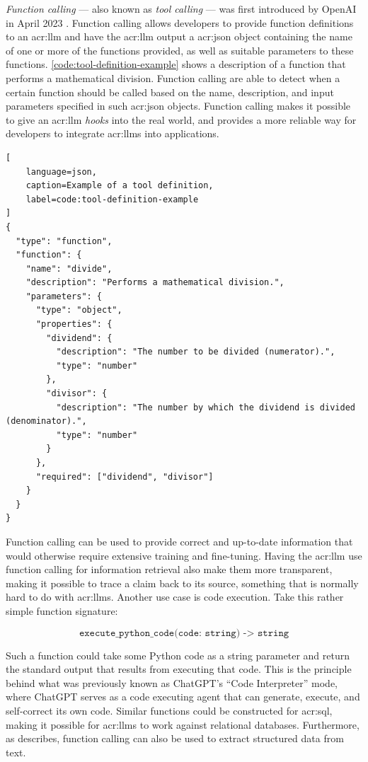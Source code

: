 \textit{Function calling} --- also known as \textit{tool calling} --- was first introduced by OpenAI in April 2023 \citep{eletiFunctionCallingOther2023}. Function calling allows developers to provide function definitions to an \gls{acr:llm} and have the \gls{acr:llm} output a \acrshort{acr:json} object containing the name of one or more of the functions provided, as well as suitable parameters to these functions. \autoref{code:tool-definition-example} shows a description of a function that performs a mathematical division. Function calling  are able to detect when a certain function should be called based on the name, description, and input parameters specified in such \acrshort{acr:json} objects. Function calling makes it possible to give an \gls{acr:llm} \textit{hooks} into the real world, and provides a more reliable way for developers to integrate \glspl{acr:llm} into applications.

\begin{lstlisting}[
    language=json,
    caption=Example of a tool definition,
    label=code:tool-definition-example
]
{
  "type": "function",
  "function": {
    "name": "divide",
    "description": "Performs a mathematical division.",
    "parameters": {
      "type": "object",
      "properties": {
        "dividend": {
          "description": "The number to be divided (numerator).",
          "type": "number"
        },
        "divisor": {
          "description": "The number by which the dividend is divided (denominator).",
          "type": "number"
        }
      },
      "required": ["dividend", "divisor"]
    }
  }
}
\end{lstlisting}

Function calling can be used to provide correct and up-to-date information that would otherwise require extensive training and fine-tuning. Having the \gls{acr:llm} use function calling for information retrieval also make them more transparent, making it possible to trace a claim back to its source, something that is normally hard to do with \glspl{acr:llm}. Another use case is code execution. Take this rather simple function signature:

$$
    \texttt{execute\_python\_code(code: string) -> string}
$$

Such a function could take some Python code as a string parameter and return the standard output that results from executing that code. This is the principle behind what was previously known as ChatGPT's \enquote{Code Interpreter} mode, where ChatGPT serves as a code executing agent that can generate, execute, and self-correct its own code. Similar functions could be constructed for \acrshort{acr:sql}, making it possible for \glspl{acr:llm} to work against relational databases. Furthermore, as \cite{eletiFunctionCallingOther2023} describes, function calling can also be used to extract structured data from text.

